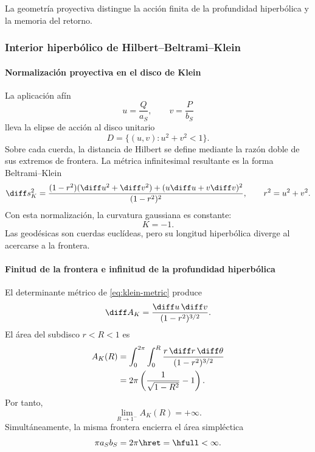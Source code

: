 \noindent La geometría proyectiva distingue la acción finita de la profundidad hiperbólica y la memoria del retorno.\par\medskip

\subsubsection{Interior hiperbólico de Hilbert--Beltrami--Klein}

\paragraph{Normalización proyectiva en el disco de Klein}

La aplicación afín
\[
u=\frac{Q}{a_S},\qquad v=\frac{P}{b_S}
\]
lleva la elipse de acción al disco unitario
\[
D=\{(u,v):u^2+v^2<1\}.
\]
Sobre cada cuerda, la distancia de Hilbert se define mediante la razón doble
de sus extremos de frontera. La métrica infinitesimal resultante es la forma
Beltrami--Klein
\begin{equation}
\diff s_K^2=
\frac{(1-r^2)(\diff u^2+\diff v^2)+(u\diff u+v\diff v)^2}
{(1-r^2)^2},
\qquad r^2=u^2+v^2.
\label{eq:klein-metric}
\end{equation}
Con esta normalización, la curvatura gaussiana es constante:
\begin{equation}
K=-1.
\label{eq:klein-curvature}
\end{equation}
Las geodésicas son cuerdas euclídeas, pero su longitud hiperbólica diverge al
acercarse a la frontera.

\paragraph{Finitud de la frontera e infinitud de la profundidad hiperbólica}

El determinante métrico de \eqref{eq:klein-metric} produce
\begin{equation}
\diff A_K=\frac{\diff u\,\diff v}{(1-r^2)^{3/2}}.
\label{eq:klein-area-density}
\end{equation}
El área del subdisco \(r<R<1\) es
\begin{align}
A_K(R)
&=\int_0^{2\pi}\int_0^R
\frac{r\,\diff r\,\diff\theta}{(1-r^2)^{3/2}}\\
&=2\pi\left(\frac1{\sqrt{1-R^2}}-1\right).
\label{eq:klein-area-R}
\end{align}
Por tanto,
\[
\lim_{R\to1^-}A_K(R)=+\infty.
\]
Simultáneamente, la misma frontera encierra el área simpléctica
\[
\pi a_Sb_S=2\pi\hret=\hfull<\infty.
\]


